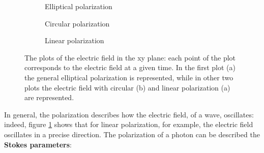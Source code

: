 \begin{figure}[h]
    \centering
    \begin{subfigure}[b]{0.3\textwidth}
        \centering
        \caption{Elliptical polarization}
    \end{subfigure}
    \hfill
    \begin{subfigure}[b]{0.3\textwidth}
        \centering
        \caption{Circular polarization}
    \end{subfigure}
    \hfill
    \begin{subfigure}[b]{0.3\textwidth}
        \centering
        \caption{Linear polarization}
    \end{subfigure}
    \caption{The plots of the electric field in the xy plane: each point of the plot corresponds to the electric field at a given time. In the first plot (a) the general elliptical polarization is represented, while in other two plots the electric field with circular (b) and linear polarization (a) are represented.}
    \label{fig:E_polarization}
\end{figure}
In general, the polarization describes how the electric field, of a wave, oscillates: indeed, figure \ref{fig:E_polarization} shows that for linear polarization, for example, the electric field oscillates in a precise direction. The polarization of a photon can be  described the \textbf{Stokes parameters}:
